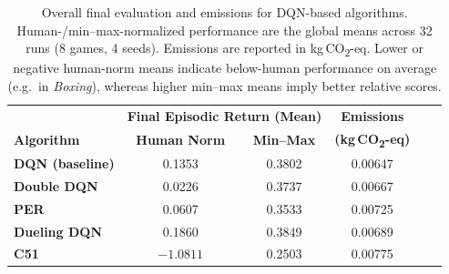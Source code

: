 \begin{table}[h]
	\caption{Overall final evaluation and emissions for DQN-based algorithms. 
		Human-/min--max-normalized performance are the global means across 32 runs (8 games, 4 seeds). 
		Emissions are reported in kg\,CO\textsubscript{2}-eq. 
		Lower or negative human-norm means indicate below-human performance on average (e.g.\ in \emph{Boxing}), 
		whereas higher min--max means imply better relative scores.}
	\label{tab:dqn_overall}
	\centering
	\begin{tabular}{lccccc}
		\toprule
		& \multicolumn{2}{c}{\textbf{Final Episodic Return (Mean)}} & 
		\multicolumn{1}{c}{\textbf{Emissions}} \\
		\cmidrule(lr){2-3} \cmidrule(lr){4-4}
		\textbf{Algorithm} & \textbf{Human Norm} & \textbf{Min--Max} & \textbf{(kg\,CO\textsubscript{2}-eq)} \\
		\midrule
		\textbf{DQN (baseline)} & 0.1353 & 0.3802 & 0.00647 \\
		\textbf{Double DQN}     & 0.0226 & 0.3737 & 0.00667 \\
		\textbf{PER}            & 0.0607 & 0.3533 & 0.00725 \\
		\textbf{Dueling DQN}    & 0.1860 & 0.3849 & 0.00689 \\
		\textbf{C51}            & $-1.0811$ & 0.2503 & 0.00775 \\
		\bottomrule
	\end{tabular}
\end{table}

